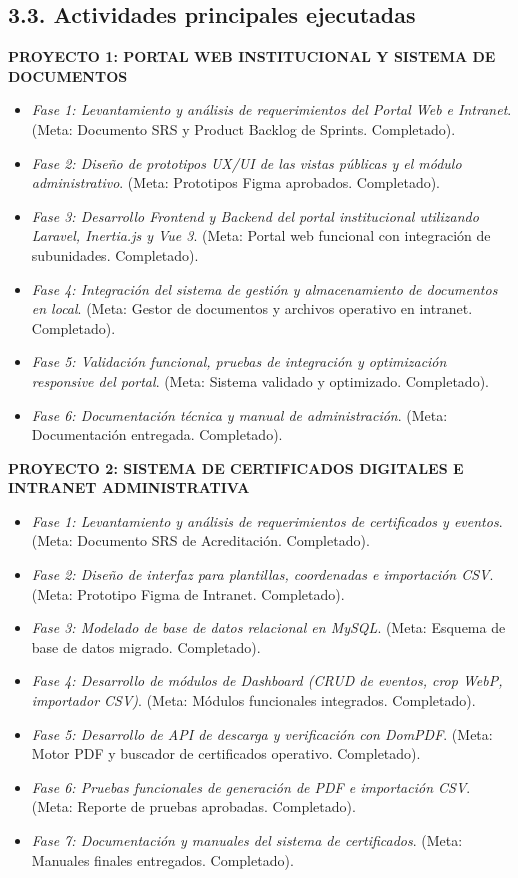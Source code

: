 \documentclass[11pt,a4paper]{article}
\begin{document}
\subsection*{3.3. Actividades principales ejecutadas}
\textbf{PROYECTO 1: PORTAL WEB INSTITUCIONAL Y SISTEMA DE DOCUMENTOS}
\begin{itemize}
    \item \textit{Fase 1: Levantamiento y análisis de requerimientos del Portal Web e Intranet}. (Meta: Documento SRS y Product Backlog de Sprints. Completado).
    \item \textit{Fase 2: Diseño de prototipos UX/UI de las vistas públicas y el módulo administrativo}. (Meta: Prototipos Figma aprobados. Completado).
    \item \textit{Fase 3: Desarrollo Frontend y Backend del portal institucional utilizando Laravel, Inertia.js y Vue 3}. (Meta: Portal web funcional con integración de subunidades. Completado).
    \item \textit{Fase 4: Integración del sistema de gestión y almacenamiento de documentos en local}. (Meta: Gestor de documentos y archivos operativo en intranet. Completado).
    \item \textit{Fase 5: Validación funcional, pruebas de integración y optimización responsive del portal}. (Meta: Sistema validado y optimizado. Completado).
    \item \textit{Fase 6: Documentación técnica y manual de administración}. (Meta: Documentación entregada. Completado).
\end{itemize}

\noindent
\textbf{PROYECTO 2: SISTEMA DE CERTIFICADOS DIGITALES E INTRANET ADMINISTRATIVA}
\begin{itemize}
    \item \textit{Fase 1: Levantamiento y análisis de requerimientos de certificados y eventos}. (Meta: Documento SRS de Acreditación. Completado).
    \item \textit{Fase 2: Diseño de interfaz para plantillas, coordenadas e importación CSV}. (Meta: Prototipo Figma de Intranet. Completado).
    \item \textit{Fase 3: Modelado de base de datos relacional en MySQL}. (Meta: Esquema de base de datos migrado. Completado).
    \item \textit{Fase 4: Desarrollo de módulos de Dashboard (CRUD de eventos, crop WebP, importador CSV)}. (Meta: Módulos funcionales integrados. Completado).
    \item \textit{Fase 5: Desarrollo de API de descarga y verificación con DomPDF}. (Meta: Motor PDF y buscador de certificados operativo. Completado).
    \item \textit{Fase 6: Pruebas funcionales de generación de PDF e importación CSV}. (Meta: Reporte de pruebas aprobadas. Completado).
    \item \textit{Fase 7: Documentación y manuales del sistema de certificados}. (Meta: Manuales finales entregados. Completado).
\end{itemize}
\end{document}
